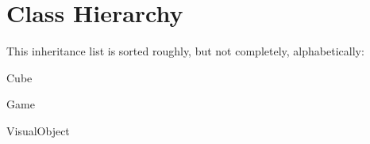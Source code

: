 \section{Class Hierarchy}
This inheritance list is sorted roughly, but not completely, alphabetically\+:\begin{DoxyCompactList}
\item Cube\begin{DoxyCompactList}
\item {}
\end{DoxyCompactList}
\item Game\begin{DoxyCompactList}
\item {}
\end{DoxyCompactList}
\item Visual\+Object\begin{DoxyCompactList}
\item {}
\item {}
\item {}
\item {}
\item {}
\item {}
\end{DoxyCompactList}
\end{DoxyCompactList}

